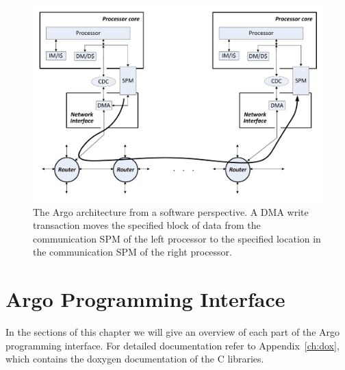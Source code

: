 \documentclass[a4paper,fontsize=10pt,twoside,DIV15,BCOR12mm,headinclude=true,footinclude=false,pagesize,bibtotoc]{scrbook}
\begin{document}
\begin{figure}
\centering
\includegraphics[width=\textwidth]{fig/argo-arch.pdf}
\caption{The Argo architecture from a software perspective. A DMA write transaction moves the specified block of data from the communication SPM of the left processor to the specified location in the communication SPM of the right processor.}
\label{fig:argo-arch}
\end{figure}


\chapter{Argo Programming Interface}
\label{chap:api}
In the sections of this chapter we will give an overview of each part of the Argo programming interface.
For detailed documentation refer to Appendix~\ref{ch:dox}, which contains the doxygen documentation of the C libraries.
\end{document}
